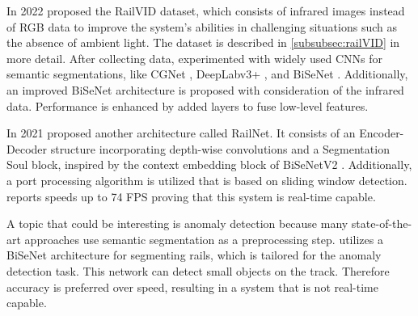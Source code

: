 In 2022 \cite{yuan2022railvid} proposed the RailVID dataset, which consists of infrared images instead of \ac{RGB} data to improve the system's abilities in challenging situations such as the absence of ambient light.
The dataset is described in \autoref{subsubsec:railVID} in more detail.
After collecting data, \cite{yuan2022railvid} experimented with widely used \ac{CNN}s for semantic segmentations, like \ac{CGNet} \cite{CGNet}, DeepLabv3+ \cite{DeepLabV3plus2018}, and \ac{BiSeNet} \cite{BiSeNet2019}.
Additionally, an improved BiSeNet architecture is proposed with consideration of the infrared data. Performance is enhanced by added layers to fuse low-level features.

In 2021 \cite{AccurateLightweightRailNet2021} proposed another architecture called RailNet.
It consists of an Encoder-Decoder structure incorporating depth-wise convolutions and a Segmentation Soul block, inspired by the context embedding block of \ac{BiSeNet}V2 \cite{BiSeNetV22021}.
Additionally, a port processing algorithm is utilized that is based on sliding window detection.
\cite{AccurateLightweightRailNet2021} reports speeds up to 74 \ac{FPS} proving that this system is real-time capable.

A topic that could be interesting is anomaly detection because many state-of-the-art approaches use semantic segmentation as a preprocessing step.
\cite{anomalyDetection2021} utilizes a \ac{BiSeNet} architecture \cite{BiSeNet2019}  for segmenting rails, which is tailored for the anomaly detection task.
This network can detect small objects on the track.
Therefore accuracy is preferred over speed, resulting in a system that is not real-time capable.
